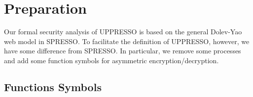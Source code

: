 \documentclass[letterpaper,onecolumn,10pt]{article}
\begin{document}
\renewcommand{\algorithmicrequire}{\textbf{Input:}}
\newcommand{\deflet}{\textbf{let}}
\newcommand{\mystate}[1]{\STATE \textbf{let} {{}#1}}
\newcommand{\mystop}[1]{\STATE \textbf{stop} \myss{\myangle{{{}#1}}, s'}}
\newcommand{\mystopp}[1]{\STATE \textbf{stop} \myss{\myangle{{{}#1}}}}
\newcommand{\myss}[1]{${{}#1}$}
\newcommand{\myangle}[1]{\langle {{}#1} \rangle}
\newcommand{\myif}[1]{\IF{\myss{{{}#1}}}}
\newcommand{\myelse}[1]{\ELSIF{\myss{{{}#1}}}}

\newcommand{\aaa}[1]{\STATE \textbf{if} #1 \textbf{then} \begin{ALC@g}}
\newcommand{\bbb}[1]{\end{ALC@g} \STATE \textbf{else if} #1 \textbf{then} \begin{ALC@g}}
\newcommand{\ccc}{\end{ALC@g} \STATE \textbf{else} \textbf{then} \begin{ALC@g}}
\newcommand{\ddd}{\end{ALC@g} \STATE \textbf{endif}}

\newcommand{\SWITCH}[1]{\STATE \textbf{switch} #1\ \textbf{do} \begin{ALC@g}}
\newcommand{\ENDSWITCH}{\end{ALC@g}\STATE \textbf{end switch}}
\newcommand{\CASE}[1]{\STATE \textbf{case} #1\textbf{:} \begin{ALC@g}}
\newcommand{\ENDCASE}{\end{ALC@g}}
\newcommand{\CASELINE}[1]{\STATE \textbf{case} #1\textbf{:} }
\newcommand{\DEFAULT}{\STATE \textbf{default:} \begin{ALC@g}}
\newcommand{\ENDDEFAULT}{\end{ALC@g}}
\newcommand{\DEFAULTLINE}[1]{\STATE \textbf{default:} }


\renewcommand{\thesection}{\Alph{section}} 


\section{Preparation}


Our formal security analysis of UPPRESSO is based on 
the general Dolev-Yao web model in SPRESSO. 
To facilitate the definition of UPPRESSO, however, 
we have some difference from SPRESSO. 
In particular, we remove some processes and 
add some function symbols for asymmetric encryption/decryption.

\subsection{Functions Symbols}
\end{document}
